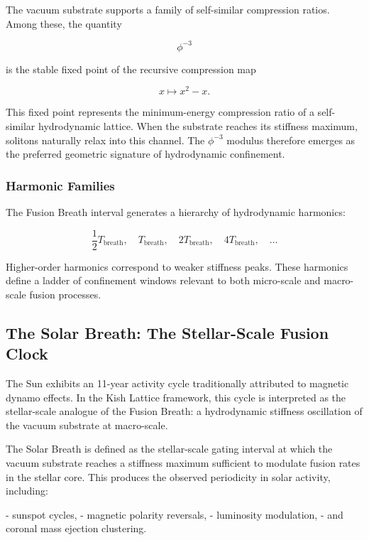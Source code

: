 \documentclass[11pt, letterpaper, openany]{book}
\begin{document}
The vacuum substrate supports a family of self-similar compression ratios. Among these,
the quantity



\[
\phi^{-3}
\]



is the stable fixed point of the recursive compression map



\[
x \mapsto x^2 - x.
\]



This fixed point represents the minimum-energy compression ratio of a self-similar
hydrodynamic lattice. When the substrate reaches its stiffness maximum, solitons
naturally relax into this channel. The $\phi^{-3}$ modulus therefore emerges as the
preferred geometric signature of hydrodynamic confinement.

\subsubsection{Harmonic Families}

The Fusion Breath interval generates a hierarchy of hydrodynamic harmonics:



\[
\frac{1}{2}T_{\text{breath}},\quad T_{\text{breath}},\quad
2T_{\text{breath}},\quad 4T_{\text{breath}},\quad \ldots
\]



Higher-order harmonics correspond to weaker stiffness peaks. These harmonics define a
ladder of confinement windows relevant to both micro-scale and macro-scale fusion
processes.

\subsection{The Solar Breath: The Stellar-Scale Fusion Clock}

The Sun exhibits an 11-year activity cycle traditionally attributed to magnetic dynamo
effects. In the Kish Lattice framework, this cycle is interpreted as the stellar-scale
analogue of the Fusion Breath: a hydrodynamic stiffness oscillation of the vacuum
substrate at macro-scale.

The Solar Breath is defined as the stellar-scale gating interval at which the vacuum
substrate reaches a stiffness maximum sufficient to modulate fusion rates in the stellar
core. This produces the observed periodicity in solar activity, including:

- sunspot cycles,
- magnetic polarity reversals,
- luminosity modulation,
- and coronal mass ejection clustering.
\end{document}

